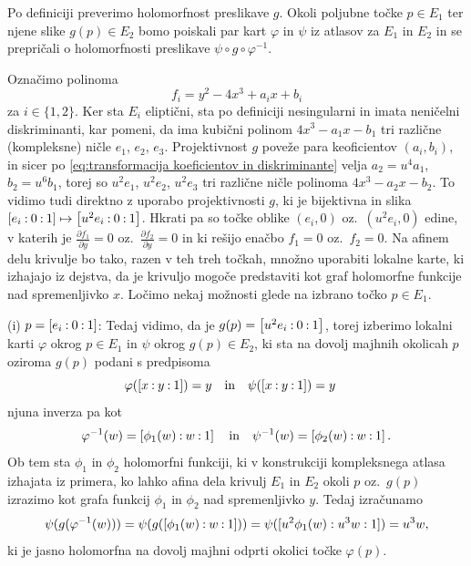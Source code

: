 \documentclass[mat1]{fmfdelo}
\numberwithin{equation}{section}
\newcommand{\inv}{^{-1}}
\newcommand{\pcoor}[1]{%
\begingroup\lccode`~=`: \lowercase{\endgroup
\edef~}{\mathbin{\mathchar\the\mathcode`:}\nobreak}%
\left[%
\begingroup
\mathcode`:=\string"8000
#1%
\endgroup
\right]%
}
\newcommand{\pdv}[2][]{\frac{\partial#1}{\partial#2}}
\newcommand{\oz}{oz.\ }
\theoremstyle{definition}
\begin{document}
\begin{dokaz}
    Po definiciji preverimo holomorfnost preslikave $g$. Okoli poljubne točke $p \in E_1$ ter njene slike $g(p) \in E_2$ bomo poiskali par kart $\varphi$ in $\psi$ iz atlasov za $E_1$ in $E_2$ in se prepričali o holomorfnosti preslikave $\psi \circ g \circ \varphi\inv$. 
    
    Označimo polinoma
    \[
        f_i = y^2 - 4x^3 + a_ix + b_i
    \]
    za $i \in \{1,2\}$.
    Ker sta $E_i$ eliptični, sta po definiciji nesingularni in imata neničelni diskriminanti, kar pomeni, da ima kubični polinom $4x^3 - a_1x - b_1$ tri različne (kompleksne) ničle $e_1$, $e_2$, $e_3$. Projektivnost $g$ poveže para keoficientov $(a_i, b_i)$, in sicer po \eqref{eq:transformacija koeficientov in diskriminante} velja $a_2 = u^4 a_1$, $b_2 = u^6 b_1$, torej so $u^2e_1$, $u^2e_2$, $u^2e_3$ tri različne ničle polinoma $4x^3 - a_2x - b_2$. To vidimo tudi direktno z uporabo projektivnosti $g$, ki je bijektivna in slika $\pcoor{e_i : 0 : 1} \mapsto \pcoor{u^2 e_i : 0 : 1}$. Hkrati pa so točke oblike $(e_i, 0)$ \oz $(u^2 e_i, 0)$ edine, v katerih je $\pdv[f_1]{y} = 0$ \oz $\pdv[f_2]{y} = 0$ in ki rešijo enačbo $f_1 = 0$ \oz $f_2 = 0$. Na afinem delu krivulje bo tako, razen v teh treh točkah, množno uporabiti lokalne karte, ki izhajajo iz dejstva, da je krivuljo mogoče predstaviti kot graf holomorfne funkcije nad spremenljivko $x$. Ločimo nekaj možnosti glede na izbrano točko $p \in E_1$.

        (i) $p = \pcoor{e_i : 0 : 1}$: Tedaj vidimo, da je $g(p) = \pcoor{u^2 e_i : 0 : 1}$, torej izberimo lokalni karti $\varphi$ okrog $p \in E_1$ in $\psi$ okrog $g(p) \in E_2$, ki sta na dovolj majhnih okolicah $p$ oziroma $g(p)$ podani s predpisoma 
        \[
            \varphi(\pcoor{x : y : 1}) = y \quad \text{in} \quad
            \psi(\pcoor{x : y : 1}) = y \quad  
        \] 
        njuna inverza pa kot 
        \[
            \varphi\inv(w) = \pcoor{\phi_1(w) : w : 1} \quad \text{in} \quad
            \psi\inv(w) = \pcoor{\phi_2(w) : w : 1}.
        \]
        Ob tem sta $\phi_1$ in $\phi_2$ holomorfni funkciji, ki v konstrukciji kompleksnega atlasa izhajata iz primera, ko lahko afina dela krivulj $E_1$ in $E_2$ okoli $p$ \oz $g(p)$ izrazimo kot grafa funkcij $\phi_1$ in $\phi_2$ nad spremenljivko $y$. Tedaj izračunamo
        \[
            \psi(g(\varphi\inv(w))) = 
            \psi(g(\pcoor{\phi_1(w) : w : 1})) = 
            \psi([u^2\phi_1(w) : u^3w : 1]) = 
            u^3w,
        \]
        ki je jasno holomorfna na dovolj majhni odprti okolici točke $\varphi(p)$. 


\end{dokaz}
\end{document}
